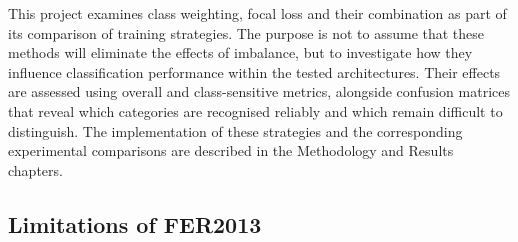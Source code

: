 \documentclass[12pt, a4paper]{report}
\let\oldsubsection\subsection
\renewcommand{\subsection}{%
    \Needspace{6\baselineskip}%
    \oldsubsection
}
\begin{document}
				This project examines class weighting, focal loss and their combination as part of its comparison of training strategies. The purpose is not to assume that these methods will eliminate the effects of imbalance, but to investigate how they influence classification performance within the tested architectures. Their effects are assessed using overall and class-sensitive metrics, alongside confusion matrices that reveal which categories are recognised reliably and which remain difficult to distinguish. The implementation of these strategies and the corresponding experimental comparisons are described in the Methodology and Results chapters.
				
			\subsection{Limitations of FER2013}
				
\end{document}
